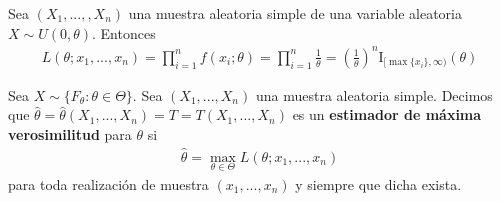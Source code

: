 \begin{ejemplo}
    Sea $(X_1,...,,X_n)$ una muestra aleatoria simple de una variable aleatoria $X \sim U(0,\theta)$. Entonces
    \begin{align*}
        L(\theta;x_1,...,x_n) = \prod_{i=1}^{n}{f(x_i;\theta)} = \prod_{i=1}^{n}{\frac{1}{\theta}} = \left( \frac{1}{\theta}\right)^n  \text{I}_{[\max{\{x_i\}},\infty)}(\theta)
    \end{align*}
\end{ejemplo}

\begin{defi}
    Sea $X \sim \{ F_{\theta} : \theta \in \Theta \}$. Sea $(X_1,...,X_n)$ una muestra aleatoria simple. Decimos que $\hat{\theta} = \hat{\theta}(X_1,...,X_n) = T = T(X_1,...,X_n)$ es un \textbf{estimador de máxima verosimilitud} para $\theta$ si
    \begin{align*}
        \hat{\theta} = \max_{\theta \in \Theta}{L(\theta;x_1,...,x_n)}
    \end{align*}
    para toda realización de muestra $(x_1,...,x_n)$ y siempre que dicha exista.
\end{defi}


